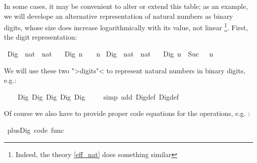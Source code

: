 \begin{isabellebody}
\begin{isamarkuptext}
  In some cases, it may be convenient to alter or
  extend this table;  as an example, we will develope an alternative
  representation of natural numbers as binary digits, whose
  size does increase logarithmically with its value, not linear
  \footnote{Indeed, the  theory \ref{eff_nat}
    does something similar}.  First, the digit representation:%
\end{isamarkuptext}%
\isamarkuptrue%
\isamarkupfalse%
\ Dig{}\ {\isacharcolon}{\isacharcolon}\ {\isachardoublequoteopen}nat\ {\isasymRightarrow}\ nat{\isachardoublequoteclose}\ \isanewline
\ \ {\isachardoublequoteopen}Dig{}\ n\ {\isacharequal}\ {}\ {\isacharasterisk}\ n{\isachardoublequoteclose}\isanewline
\isanewline
{}\isamarkupfalse%
\ Dig{}\ {\isacharcolon}{\isacharcolon}\ {\isachardoublequoteopen}nat\ {\isasymRightarrow}\ nat{\isachardoublequoteclose}\ \isanewline
\ \ {\isachardoublequoteopen}Dig{}\ n\ {\isacharequal}\ Suc\ {\isacharparenleft}{}\ {\isacharasterisk}\ n{\isacharparenright}{\isachardoublequoteclose}%
\begin{isamarkuptext}%
\noindent We will use these two ">digits"< to represent natural numbers
  in binary digits, e.g.:%
\end{isamarkuptext}%
\isamarkuptrue%
\isamarkupfalse%
\ {}{}{\isacharcolon}\ {\isachardoublequoteopen}{}{}\ {\isacharequal}\ Dig{}\ {\isacharparenleft}Dig{}\ {\isacharparenleft}Dig{}\ {\isacharparenleft}Dig{}\ {\isacharparenleft}Dig{}\ {}{\isacharparenright}{\isacharparenright}{\isacharparenright}{\isacharparenright}{\isachardoublequoteclose}\isanewline
%
\isadelimproof
\ \ %
\endisadelimproof
%
\isatagproof
{}\isamarkupfalse%
\ {\isacharparenleft}simp\ add{\isacharcolon}\ Dig{}{\isacharunderscore}def\ Dig{}{\isacharunderscore}def{\isacharparenright}%
\endisatagproof
{\isafoldproof}%
%
\isadelimproof
%
\endisadelimproof
%
\begin{isamarkuptext}%
\noindent Of course we also have to provide proper code equations for
  the operations, e.g. :%
\end{isamarkuptext}%
\isamarkuptrue%
\isamarkupfalse%
\ plus{\isacharunderscore}Dig\ {\isacharbrackleft}code\ func{\isacharbrackright}{\isacharcolon}\isanewline

\end{isabellebody}
